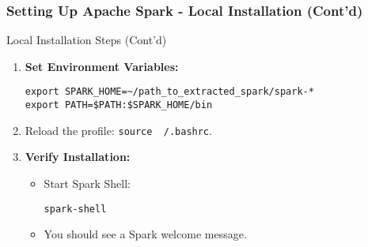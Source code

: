 \documentclass[aspectratio=169]{beamer}
\begin{document}
\begin{frame}[fragile]
    \frametitle{Setting Up Apache Spark - Local Installation (Cont'd)}
    \begin{block}{Local Installation Steps (Cont'd)}
        \begin{enumerate}[resume]
            \item \textbf{Set Environment Variables:}
            \begin{lstlisting}
export SPARK_HOME=~/path_to_extracted_spark/spark-*
export PATH=$PATH:$SPARK_HOME/bin
            \end{lstlisting}
            \item Reload the profile: \texttt{source ~/.bashrc}.
            \item \textbf{Verify Installation:}
            \begin{itemize}
                \item Start Spark Shell:
                \begin{lstlisting}
spark-shell
                \end{lstlisting}
                \item You should see a Spark welcome message.
            \end{itemize}
        \end{enumerate}
    \end{block}
\end{frame}
\end{document}
